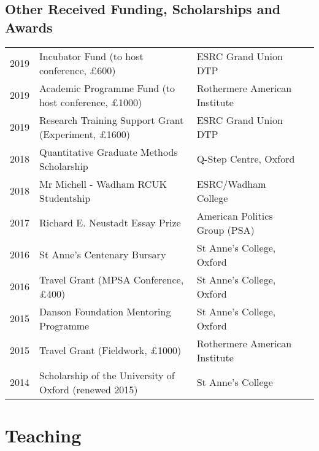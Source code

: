 \documentclass[11pt, a4paper]{article}
\begin{document}
\subsection*{Other Received Funding, Scholarships and Awards}
 \begin{tabular}{llll}
     2019 & Incubator Fund (to host conference, £600) & ESRC Grand Union DTP \\
     2019 & Academic Programme Fund (to host conference, £1000) & Rothermere American Institute \\
     2019 & Research Training Support Grant (Experiment, £1600) & ESRC Grand Union DTP \\
     2018 & Quantitative Graduate Methods Scholarship & Q-Step Centre, Oxford \\
     2018 & Mr Michell - Wadham RCUK Studentship & ESRC/Wadham College\\
     2017 & Richard E. Neustadt Essay Prize & American Politics Group (PSA) \\
     2016 & St Anne's Centenary Bursary & St Anne's College, Oxford \\
     2016 & Travel Grant (MPSA Conference, £400) & St Anne's College, Oxford \\
     2015 & Danson Foundation Mentoring Programme & St Anne's College, Oxford \\
     2015 & Travel Grant (Fieldwork, £1000) & Rothermere American Institute \\
     2014 & Scholarship of the University of Oxford (renewed 2015) & St Anne's College

 \end{tabular}

 \section*{Teaching}
\end{document}
